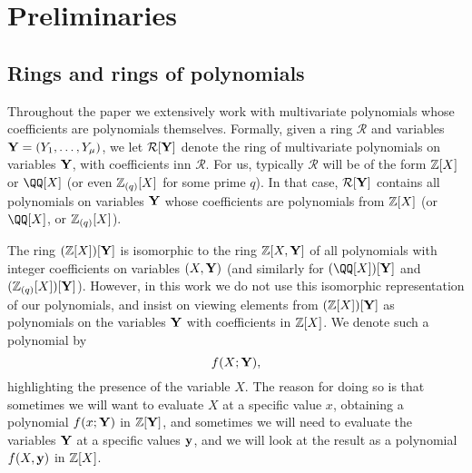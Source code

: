 \documentclass[11pt,letterpaper,usenames,dvipsnames]{article}
\title{\stylizedtitle}
\author{
	Albert Garreta, Psi Vesely, Arantxa Zapico
}
\date{\today}
\begin{document}
\maketitle

\begin{abstract}
\end{abstract}

\setcounter{tocdepth}{2}
\begin{spacing}{0.8}
{\footnotesize \tableofcontents}
\end{spacing}
\section{Preliminaries}

\newcommand{\cR}{\mathcal{R}}


        

\subsection{Rings and rings of polynomials} Throughout the paper we extensively work with multivariate polynomials whose coefficients are polynomials themselves. Formally, given a ring $\cR$ and variables $\mathbf{Y}=(Y_1,\ldots, Y_\mu)$, we let $\cR[\YY]$ denote the ring of multivariate polynomials on variables $\mathbf{Y}$, with coefficients inn $\cR$. For us, typically $\cR$ will be of the form $\mathbb{Z}[X]$ or $\QQ[X]$ (or even $\mathbb{Z}_{(q)}[X]$ for some prime $q$). In that case, $\cR[\YY]$ contains all polynomials on variables $\mathbf{Y}$ whose coefficients are polynomials from $\mathbb{Z}[X]$ (or $\QQ[X]$, or $\mathbb{Z}_{(q)}[X]$). 

The ring $(\mathbb{Z}[X])[\mathbf{Y}]$ is isomorphic to the ring $\mathbb{Z}[X, \mathbf{Y}]$ of all polynomials with integer coefficients on variables $(X,\mathbf{Y})$  (and similarly for $(\QQ[X])[\YY]$ and $(\mathbb{Z}_{(q)}[X])[\mathbf{Y}]$). However, in this work we do not use this isomorphic representation of our polynomials, and insist on viewing elements from $(\mathbb{Z}[X])[\mathbf{Y}]$ as polynomials on the variables $\mathbf{Y}$ with coefficients in $\mathbb{Z}[X]$. We denote such a polynomial by $$f(X;\mathbf{Y}),$$
highlighting the presence of the variable $X$. The reason for doing so is that sometimes we will want to evaluate $X$ at a specific value $x$, obtaining a polynomial $f(x;\mathbf{Y})$ in $\mathbb{Z}[\mathbf{Y}]$, and sometimes we will need to evaluate the variables $\mathbf{Y}$ at a specific values $\mathbf{y}$, and we will look at the result as  a polynomial $f(X,\mathbf{y})$ in $\mathbb{Z}[X]$. 
\end{document}
